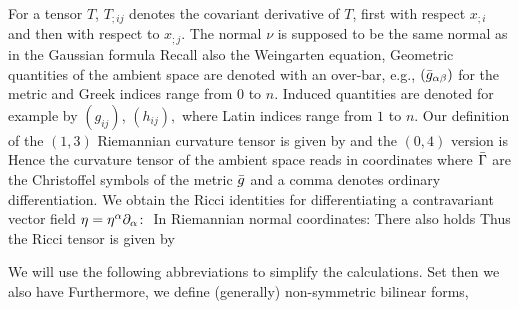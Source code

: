 For a tensor $T$, $T_{;ij}$ denotes the covariant derivative of $T$, first with respect $x_{;i}$ and then with respect to $x_{;j}.$ The normal $\nu$ is supposed to be the same normal as in the Gaussian formula
Recall also the Weingarten equation,
Geometric quantities of the ambient space are denoted with an over-bar, e.g., $(\-g_{\a\b})$ for the metric and Greek indices range from $0$ to $n.$ Induced quantities are denoted for example by $(g_{ij})$, $(h_{ij}),$ where Latin indices range from $1$ to $n.$
Our definition of the $(1,3)$ Riemannian curvature tensor is given by
and the $(0,4)$ version is
Hence the curvature tensor of the ambient space reads in coordinates
where $\-\G$ are the Christoffel symbols of the metric $\-g$ and a comma denotes ordinary differentiation.
We obtain the Ricci identities for differentiating a contravariant vector field $\eta=\eta^{\a}\del_{\a}\cn$
In Riemannian normal coordinates:
There also holds
Thus the Ricci tensor is given by

We will use the following abbreviations to simplify the calculations. Set
then we also have
Furthermore, we define (generally) non-symmetric bilinear forms,

